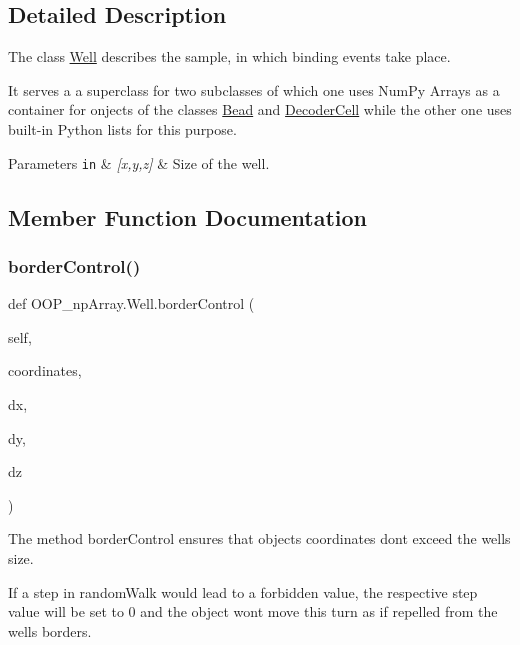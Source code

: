 \subsection{Detailed Description}
The class \mbox{\hyperlink{class_o_o_p__np_array_1_1_well}{Well}} describes the sample, in which binding events take place. 

It serves a a superclass for two subclasses of which one uses Num\+Py Arrays as a container for onjects of the classes \mbox{\hyperlink{class_o_o_p__np_array_1_1_bead}{Bead}} and \mbox{\hyperlink{class_o_o_p__np_array_1_1_decoder_cell}{Decoder\+Cell}} while the other one uses built-\/in Python lists for this purpose.


\begin{DoxyParams}[1]{Parameters}
\mbox{\tt in}  & {\em \mbox{[}x,y,z\mbox{]}} & Size of the well. \\
\hline
\end{DoxyParams}


\subsection{Member Function Documentation}
\mbox{\label{class_o_o_p__np_array_1_1_well_a8991b9d19614962be6a088031f780554}} 
\subsubsection{\texorpdfstring{border\+Control()}{borderControl()}}
{\footnotesize\ttfamily def O\+O\+P\+\_\+np\+Array.\+Well.\+border\+Control (\begin{DoxyParamCaption}\item[{}]{self,  }\item[{}]{coordinates,  }\item[{}]{dx,  }\item[{}]{dy,  }\item[{}]{dz }\end{DoxyParamCaption})}



The method border\+Control ensures that objects\textquotesingle{} coordinates don\textquotesingle{}t exceed the well\textquotesingle{}s size. 

If a step in random\+Walk would lead to a forbidden value, the respective step value will be set to 0 and the object won\textquotesingle{}t move this turn as if repelled from the well\textquotesingle{}s borders.


